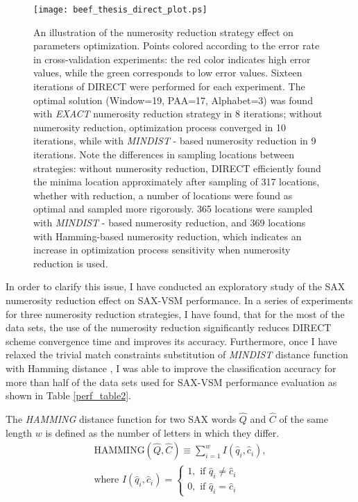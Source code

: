 \begin{figure}[ht]
   \centering
   \texttt{[image: beef\_thesis\_direct\_plot.ps]}
   \caption{
   {\small An illustration of the numerosity reduction strategy effect on parameters optimization. 
   Points colored according to the error rate in cross-validation experiments: the red color indicates high error values, while 
   the green corresponds to low error values. Sixteen iterations of DIRECT were performed for each experiment.
   The optimal solution (Window=19, PAA=17, Alphabet=3) was found with \textit{EXACT} numerosity reduction strategy 
   in 8 iterations; without numerosity reduction, optimization process converged in 10 iterations, while 
   with \textit{MINDIST} - based numerosity reduction in 9 iterations. 
   Note the differences in sampling locations between strategies: without numerosity reduction, DIRECT efficiently found 
   the minima location approximately after sampling of 317 locations, 
   whether with reduction, a number of locations were found as optimal and sampled more rigorously. 
   365 locations were sampled with \textit{MINDIST} - based numerosity reduction, and 369 locations with Hamming-based 
   numerosity reduction, which indicates an increase in optimization process sensitivity when numerosity reduction is used.}
   }
   \label{fig:sax_nr}
\end{figure}

In order to clarify this issue, I have conducted an exploratory study of the SAX numerosity reduction 
effect on SAX-VSM performance. In a series of experiments for three numerosity reduction strategies, I have found, 
that for the most of the data sets, the use of the numerosity reduction significantly reduces DIRECT scheme convergence 
time and improves its accuracy. 
Furthermore, once I have relaxed the trivial match constraints substitution of \textit{MINDIST} distance function 
with Hamming distance \cite{hamming}, I was able to improve the classification accuracy for more than half of the data 
sets used for SAX-VSM performance evaluation as shown in Table \ref{perf_table2}. 

The \textit{HAMMING} distance function for two SAX words $\hat{Q}$ and $\hat{C}$ of the same length $w$ 
is defined as the number of letters in which they differ.
\begin{equation}
\label{eq:hamming}
\begin{split}
\text{HAMMING}(\widehat{Q},\widehat{C}) \equiv \sum_{i=1}^{w} I( \widehat{q}_{i}, \widehat{c}_{i} ), \\
\text{where } I( \widehat{q}_{i}, \widehat{c}_{i} ) = 
\begin{cases}
 1,\text{ if } \widehat{q}_{i} \neq \widehat{c}_{i} \\
 0,\text{ if } \widehat{q}_{i} = \widehat{c}_{i}
\end{cases}
\end{split}                                                      
\end{equation}

